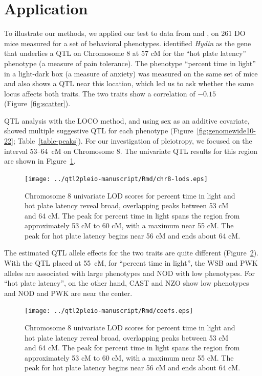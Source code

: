 \documentclass[oneside]{book}\usepackage[]{graphicx}\usepackage[]{color}
\begin{document}
\section{Application}
\label{sec:app}

To illustrate our methods, we applied our test to data from
\citet{logan2013high} and \citet{recla2014precise}, on 261 DO mice
measured for a set of behavioral phenotypes.
\citet{recla2014precise} identified \textit{Hydin} as the gene that
underlies a QTL on Chromosome 8 at 57 cM for the ``hot plate latency''
phenotype (a measure of pain tolerance). The phenotype ``percent time in light''
in a light-dark box (a measure of anxiety) was
measured on the same set of mice \citep{logan2013high} and also shows a QTL near
this location, which led us to ask whether the same locus affects both traits.
The two traits show a correlation of $-0.15$ (Figure~\ref{fig:scatter}).

QTL analysis with the LOCO method, and using sex as an additive
covariate, showed multiple suggestive QTL for each
phenotype (Figure~\ref{fig:genomewide10-22}; Table~\ref{table-peaks}). For our investigation of
pleiotropy, we focused on the interval 53--64~cM on Chromosome 8.
The univariate QTL results for this region are shown in
Figure~\ref{fig:chr8-lod}.

\begin{figure}
\texttt{[image: ../qtl2pleio-manuscript/Rmd/chr8-lods.eps]}
\caption{Chromosome 8 univariate LOD scores for percent time in light
  and hot plate latency reveal broad, overlapping peaks between 53 cM
  and 64 cM. The peak for percent time in light spans the region from
  approximately 53 cM to 60 cM, with a maximum near 55 cM. The peak
  for hot plate latency begins near 56 cM and ends about 64 cM.}
\label{fig:chr8-lod}
\end{figure}


The estimated QTL allele effects for the two traits are quite
different (Figure~\ref{fig:chr8-effects}).
With the QTL placed at 55~cM, for ``percent time in light'', the WSB and PWK alleles are associated
with large phenotypes and NOD with low phenotypes.
For ``hot plate latency'', on the other hand,
CAST and NZO show low phenotypes and NOD and PWK are near the center.

\begin{figure}
\texttt{[image: ../qtl2pleio-manuscript/Rmd/coefs.eps]}
\caption{Chromosome 8 univariate LOD scores for percent time in light
  and hot plate latency reveal broad, overlapping peaks between 53 cM
  and 64 cM. The peak for percent time in light spans the region from
  approximately 53 cM to 60 cM, with a maximum near 55 cM. The peak
  for hot plate latency begins near 56 cM and ends about 64 cM.}
\label{fig:chr8-effects}
\end{figure}
\end{document}
